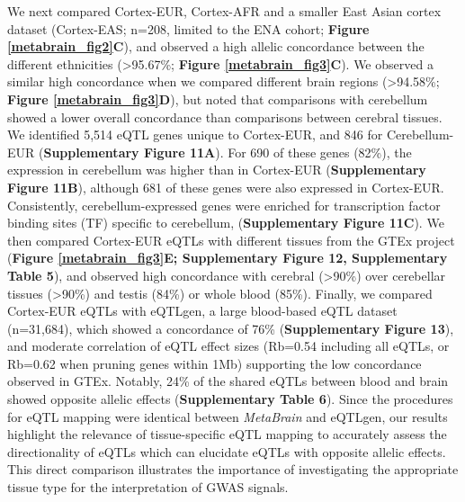 We next compared Cortex-EUR, Cortex-AFR and a smaller East Asian cortex dataset (Cortex-EAS; n=208, limited to the ENA cohort; \textbf{Figure \ref{metabrain_fig2}C}), and observed a high allelic concordance between the different ethnicities (>95.67\%; \textbf{Figure \ref{metabrain_fig3}C}). We observed a similar high concordance when we compared different brain regions (>94.58\%; \textbf{Figure \ref{metabrain_fig3}D}), but noted that comparisons with cerebellum showed a lower overall concordance than comparisons between cerebral tissues. We identified 5,514 eQTL genes unique to Cortex-EUR, and 846 for Cerebellum-EUR (\textbf{Supplementary Figure 11A}). For 690 of these genes (82\%), the expression in cerebellum was higher than in Cortex-EUR (\textbf{Supplementary Figure 11B}), although 681 of these genes were also expressed in Cortex-EUR. Consistently, cerebellum-expressed genes were enriched for transcription factor binding sites (TF) specific to cerebellum, (\textbf{Supplementary Figure 11C}). We then compared Cortex-EUR eQTLs with different tissues from the GTEx project (\textbf{Figure \ref{metabrain_fig3}E; Supplementary Figure 12, Supplementary Table 5}), and observed high concordance with cerebral (>90\%) over cerebellar tissues (>90\%) and testis (84\%) or whole blood (85\%). Finally, we compared Cortex-EUR eQTLs with eQTLgen, a large blood-based eQTL dataset (n=31,684), which showed a concordance of 76\% (\textbf{Supplementary Figure 13}), and moderate correlation of eQTL effect sizes\cite{fuUnravelingRegulatoryMechanisms2012} (Rb=0.54 including all eQTLs, or Rb=0.62 when pruning genes within 1Mb) supporting the low concordance observed in GTEx. Notably, 24\% of the shared eQTLs between blood and brain showed opposite allelic effects (\textbf{Supplementary Table 6}). Since the procedures for eQTL mapping were identical between \emph{MetaBrain} and eQTLgen, our results highlight the relevance of tissue-specific eQTL mapping to accurately assess the directionality of eQTLs which can elucidate eQTLs with opposite allelic effects\cite{glastonburyCellTypeHeterogeneityAdipose2019}. This direct comparison illustrates the importance of investigating the appropriate tissue type for the interpretation of GWAS signals. 

